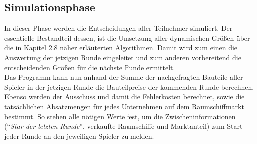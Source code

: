 \subsection{Simulationsphase}
\label{sec:spielwelt-regeln-simulationsphase}

In dieser Phase werden die Entscheidungen aller Teilnehmer  simuliert. Der essentielle Bestandteil dessen, ist die Umsetzung aller dynamischen Größen über die in Kapitel 2.8 näher erläuterten Algorithmen. Damit wird zum einen die Auswertung der jetzigen Runde eingeleitet und zum anderen vorbereitend die entscheidenden Größen für die nächste Runde ermittelt. 
\\
Das Programm kann nun anhand der Summe der nachgefragten Bauteile aller Spieler in der jetzigen Runde die Bauteilpreise der kommenden Runde berechnen. Ebenso werden der Ausschuss und damit die Fehlerkosten berechnet, sowie die tatsächlichen Absatzmengen für jedes Unternehmen auf dem Raumschiffmarkt bestimmt. So stehen alle nötigen Werte fest, um die Zwischeninformationen ("`\textit{Star der letzten Runde}"', verkaufte Raumschiffe und Marktanteil) zum Start jeder Runde an den jeweiligen Spieler zu melden.




